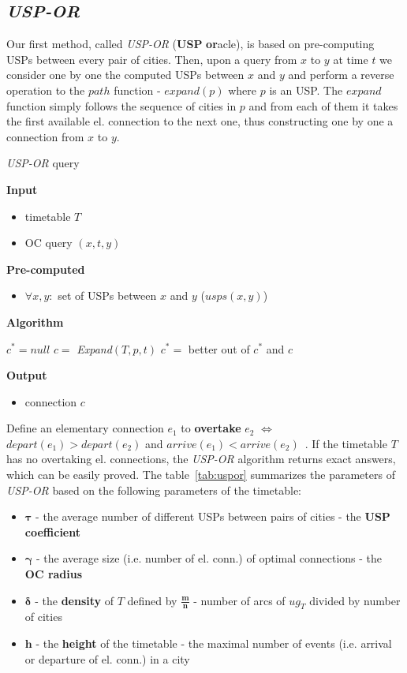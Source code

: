 \documentclass{svk_long_en}
\begin{document}
	\subsection{\textit{USP-OR}}
	
		Our first method, called \textit{USP-OR} (\textbf{USP} \textbf{or}acle), is based on pre-computing USPs between every pair of cities. Then, upon a query from $x$ to $y$ at time $t$ we consider one by one the computed USPs between $x$ and $y$ and perform a reverse operation to the $path$ function - $expand(p)$ where $p$ is an USP. The $expand$ function simply follows the sequence of cities in $p$ and from each of them it takes the first available el. connection to the next one, thus constructing one by one a connection from $x$ to $y$. 
		
		\color{algcolor}
		\begin{algorithm}[H]
			\color{inalgcolor}
			\caption{\textit{USP-OR} query}
			\label{alg:uspor-query}
			\textbf{Input} 
			\begin{itemize}
				\item timetable $T$
				\item OC query $(x, t, y)$
			\end{itemize}
			\textbf{Pre-computed} 
			\begin{itemize}
				\item $\forall x, y:$ set of USPs between $x$ and $y$ ($usps(x, y)$)
			\end{itemize}
			\textbf{Algorithm}
			\begin{algorithmic}
				\STATE $c^{*} = null$
					\STATE $c =$ \textit{Expand}$(T, p, t)$
					\STATE $c^{*} =$ better out of $c^{*}$ and $c$
				\ENDFOR
			\end{algorithmic}
			\textbf{Output}
			\begin{itemize}
				\item connection $c$
			\end{itemize}
		\end{algorithm}
		\color{black}

		Define an elementary connection $e_{1}$ to \textbf{overtake} $e_{2}$ $\iff$ $depart(e_{1}) > depart(e_{2})$ and $arrive(e_{1}) < arrive(e_{2})$~\cite{tdroute09}. If the timetable $T$ has no overtaking el. connections, the \textit{USP-OR} algorithm returns exact answers, which can be easily proved. The table~\ref{tab:uspor} summarizes the parameters of \textit{USP-OR} based on the following parameters of the timetable:
		\begin{itemize}
			\item $\bm{\tau}$ - the average number of different USPs between pairs of cities - the \textbf{USP coefficient}
			\item $\bm{\gamma}$ - the average size (i.e. number of el. conn.) of optimal connections - the \textbf{OC radius}
			\item $\bm{\delta}$ - the \textbf{density} of $T$ defined by $\frac{\bm{m}}{\bm{n}}$ - number of arcs of $ug_{T}$ divided by number of cities
			\item $\bm{h}$ - the \textbf{height} of the timetable - the maximal number of events (i.e. arrival or departure of el. conn.) in a city
		\end{itemize}
		
\end{document}
